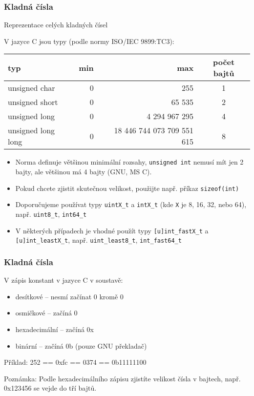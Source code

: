 \documentclass{beamer}
\begin{document}
\begin{frame}
\frametitle{Kladná čísla}
Reprezentace celých kladných čísel

V jazyce C jsou typy (podle normy ISO/IEC 9899:TC3):
\begin{tabular}{|l|r|r|c|}\hline
typ & min & max & počet bajtů\\ \hline
unsigned char & 0 & 255 & 1 \\ \hline
unsigned short & 0 & 65 535 & 2 \\ \hline 
unsigned long & 0 & 4 294 967 295 & 4 \\ \hline
unsigned long long & 0 & 18 446 744 073 709 551 615 & 8 \\ \hline
\end{tabular}

\begin{itemize}
\item Norma definuje většinou minimální rozsahy, \texttt{unsigned int} nemusí mít jen 2 bajty, ale většinou má 4 bajty (GNU, MS C).
\item Pokud chcete zjistit skutečnou velikost, použijte např. příkaz \texttt{sizeof(int)}
\item Doporučujeme používat typy \texttt{uintX\_t} a \texttt{intX\_t} (kde \texttt{X} je 8, 16, 32, nebo 64), např. \texttt{uint8\_t}, \texttt{int64\_t} 
\item V některých případech je vhodné použít typy \texttt{[u]int\_fastX\_t} a \texttt{[u]int\_leastX\_t}, např. \texttt{uint\_least8\_t}, \texttt{int\_fast64\_t} 
\end{itemize}

\end{frame}


\begin{frame}
\frametitle{Kladná čísla}
V zápis konstant v jazyce C v soustavě:
\begin{itemize}
\item desítkové -- nesmí začínat 0 kromě 0
\item osmičkové -- začíná 0
\item hexadecimální -- začíná 0x
\item binární -- začíná 0b (pouze GNU překladač)
\end{itemize}
\bigskip
Příklad: 252 == 0xfc == 0374 == 0b11111100
\bigskip

Poznámka: Podle hexadecimálního zápisu zjistíte velikost čísla v bajtech, např. 0x123456 se vejde do tří bajtů.
\end{frame}
\end{document}
